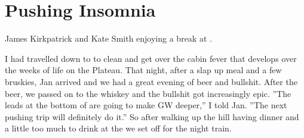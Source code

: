 \section{Pushing Insomnia}

    \begin{marginfigure}
\checkoddpage \ifoddpage \forcerectofloat \else \forceversofloat \fi
\centering
 \caption{James Kirkpatrick and Kate Smith enjoying a break at . }
 \label{quilt kal}
\end{marginfigure}

I had travelled down to  to clean and get over the cabin fever that
develops over the weeks of life on the Plateau. That night, after a slap
up meal and a few bruskies, Jan arrived and we had a great evening of
beer and bullshit. After the beer, we passed on to the whiskey and the
bullshit got increasingly epic. ''The leads at the bottom of  are going to make GW deeper,'' I told Jan. ''The next pushing trip
will definitely do it.'' So after walking up the hill having dinner and
a little too much to drink at the  we set off for the night train.

